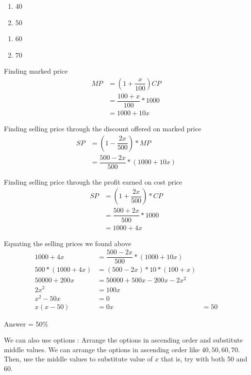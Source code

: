 \begin{multicols}{2}
    \begin{enumerate}
        \item 40
        \item 50
    \end{enumerate}

    \columnbreak
    
    \begin{enumerate} \addtocounter{enumi}{2}
        \item 60
        \item 70
    \end{enumerate}
    
\end{multicols}

Finding marked price
\begin{align*}
    MP &= ( 1 + \dfrac{x}{100} ) CP \\
    &= \dfrac{100 + x}{100} * 1000 \\
    &= 1000 + 10x
\end{align*}

Finding selling price through the discount offered on marked price
\begin{align*}
    SP &= (1 - \dfrac{2x}{500}) * MP \\
    &= \dfrac{500 - 2x}{500} * (1000 + 10x)
\end{align*}

Finding selling price through the profit earned on cost price
\begin{align*}
    SP &= (1 + \dfrac{2x}{500}) * CP \\
    &= \dfrac{500 + 2x}{500} * 1000 \\
    &= 1000 + 4x
\end{align*}

Equating the selling prices we found above
\begin{align*}
    1000 + 4x &= \dfrac{500 - 2x}{500} * (1000 + 10x) \\
    500 * (1000 + 4x) &= (500 - 2x) * 10 * (100 + x) \\
    50000 + 200x &= 50000 + 500x - 200x - 2x^2 \\
    2x^2 &= 100x \\
    x^2 - 50x &= 0 \\
    x (x - 50) &= 0
    x &= 50
\end{align*}

Answer = 50\%

\begin{EXTRA-LEARNING}
    We can also use options : Arrange the options in ascending order and substitute middle values. We can arrange the options in ascending order like $40,50,60,70$. Then, use the middle values to substitute value of $x$ that is, try with both 50 and 60.  
\end{EXTRA-LEARNING}

